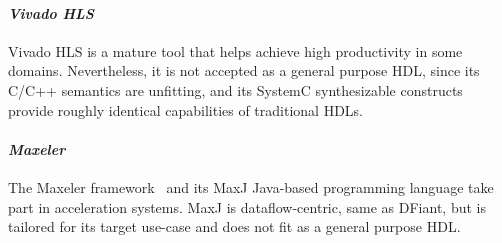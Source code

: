 \paragraph*{\bf \em Vivado HLS} 
Vivado HLS is a mature tool that helps achieve high productivity in some domains. Nevertheless, it is not accepted as a general purpose HDL, since its C/C++ semantics are unfitting, and its SystemC synthesizable constructs provide roughly identical capabilities of traditional HDLs. 

\paragraph*{\bf \em Maxeler} 
The Maxeler framework~\cite{Pell2011} and its MaxJ Java-based programming language take part in acceleration systems. MaxJ is dataflow-centric, same as DFiant, but is tailored for its target use-case and does not fit as a general purpose HDL.
